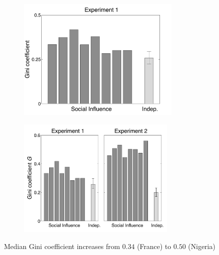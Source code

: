 \documentclass[aspectratio=169]{beamer}
\begin{document}
\begin{frame}

\begin{figure}
  \centering
  \includegraphics[width=0.7\textwidth]{figures/gini_v1_unordered_ci}
\end{figure}

\end{frame}
\begin{frame}

\begin{figure}
  \centering
  \includegraphics[width=3in]{figures/compare_gini_v1v2_unordered_ci}
\end{figure}

Median Gini coefficient increases from $0.34$ (France) to $0.50$ (Nigeria)
\end{frame}
\end{document}
